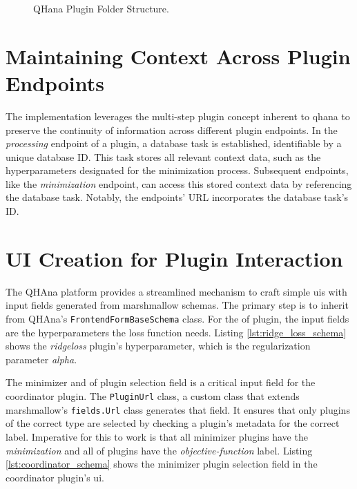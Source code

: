 \documentclass[
  a4paper,  %
  twoside,  %
  bibliography=totoc,
  headsepline,
  cleardoublepage=empty,
  parskip=half,
  draft=false
]{scrbook}
\begin{document}
\begin{figure}[h!]
  \caption{QHana Plugin Folder Structure.}
  \label{fig:folderStructure}
\end{figure}

\section{Maintaining Context Across Plugin Endpoints}
\label{sec:contextBetweenPluginEndpoints}

The implementation leverages the multi-step plugin concept inherent to \gls{qhana} to preserve the continuity of information across different plugin endpoints.
In the \emph{processing} endpoint of a plugin, a database task is established, identifiable by a unique database ID.
This task stores all relevant context data, such as the hyperparameters designated for the minimization process.
Subsequent endpoints, like the \emph{minimization} endpoint, can access this stored context data by referencing the database task.
Notably, the endpoints' URL incorporates the database task's ID.


\section{UI Creation for Plugin Interaction}
\label{sec:uiCreationForPluginInteraction}
The QHAna platform provides a streamlined mechanism to craft simple \glspl{ui} with input fields generated from marshmallow schemas.
The primary step is to inherit from QHAna's \texttt{FrontendFormBaseSchema} class.
For the \gls{of} plugin, the input fields are the hyperparameters the loss function needs.
Listing \ref{lst:ridge_loss_schema} shows the \emph{ridge\-loss} plugin's hyperparameter, which is the regularization parameter \emph{alpha}.

\noindent\begin{minipage}{\linewidth}
  
\end{minipage}

The minimizer and \gls{of} plugin selection field is a critical input field for the coordinator plugin.
The \texttt{PluginUrl} class,  a custom class that extends marshmallow's \texttt{fields.Url} class generates that field.
It ensures that only plugins of the correct type are selected by checking a plugin's metadata for the correct label.
Imperative for this to work is that all minimizer plugins have the \emph{minimization} and all \gls{of} plugins have the \emph{objective-function} label.
Listing \ref{lst:coordinator_schema} shows the minimizer plugin selection field in the coordinator plugin's \gls{ui}.
\end{document}
